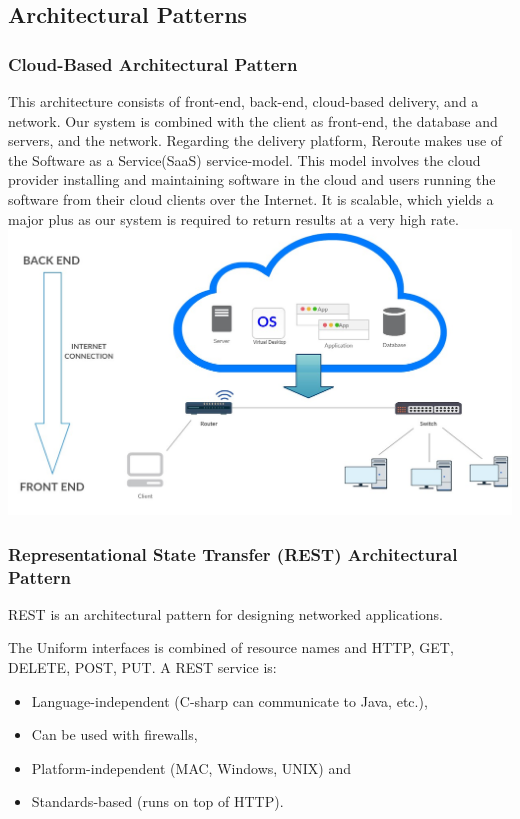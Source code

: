 \documentclass[a4paper,10pt]{article}
\begin{document}
	\subsection{Architectural Patterns}
	\subsubsection{Cloud-Based Architectural Pattern}
	This architecture consists of front-end, back-end, cloud-based delivery, and a network.
	Our system is combined with the client as front-end, the database and servers, and the network. 
	Regarding the delivery platform, Reroute makes use of the Software as a Service(SaaS) service-model. This model involves
	the cloud provider installing and maintaining software in the cloud and users running the software from their cloud clients
	over the Internet. It is scalable, which yields a major plus as our system is required to return results at a very high rate.\\
	
	\includegraphics[scale=0.4]{Diagrams/Cloud-based Architectural Diagram.jpg}\\

	\subsubsection{Representational State Transfer (REST) Architectural Pattern}
	REST is an architectural pattern for designing networked applications.

The Uniform interfaces is combined of resource names and HTTP, GET, DELETE, POST, PUT.
A REST service is:
\begin{itemize}
	\item Language-independent (C-sharp can communicate to Java, etc.),
	\item Can be used with firewalls,
	\item Platform-independent (MAC, Windows, UNIX) and
	\item Standards-based (runs on top of HTTP).
\end{itemize}
\end{document}
